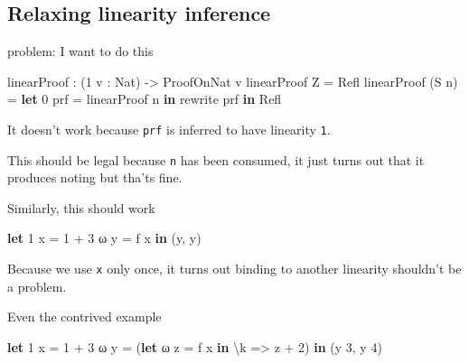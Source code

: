 \documentclass[
]{article}
\newenvironment{Shaded}{}{}
\newcommand{\DataTypeTok}[1]{\textcolor[rgb]{0.56,0.13,0.00}{#1}}
\newcommand{\DecValTok}[1]{\textcolor[rgb]{0.25,0.63,0.44}{#1}}
\newcommand{\KeywordTok}[1]{\textcolor[rgb]{0.00,0.44,0.13}{\textbf{#1}}}
\newcommand{\NormalTok}[1]{#1}
\newcommand{\OperatorTok}[1]{\textcolor[rgb]{0.40,0.40,0.40}{#1}}
\newcommand{\OtherTok}[1]{\textcolor[rgb]{0.00,0.44,0.13}{#1}}
\begin{document}
\hypertarget{relaxing-linearity-inference}{%
\subsection{Relaxing linearity
inference}\label{relaxing-linearity-inference}}

problem: I want to do this

\begin{Shaded}
\begin{Highlighting}[]
\NormalTok{linearProof }\OperatorTok{:}\NormalTok{ (}\DecValTok{1}\NormalTok{ v }\OperatorTok{:} \DataTypeTok{Nat}\NormalTok{) }\OtherTok{{-}\textgreater{}} \DataTypeTok{ProofOnNat}\NormalTok{ v}
\NormalTok{linearProof }\DataTypeTok{Z} \OtherTok{=} \DataTypeTok{Refl} 
\NormalTok{linearProof (}\DataTypeTok{S}\NormalTok{ n) }\OtherTok{=} \KeywordTok{let} \DecValTok{0}\NormalTok{ prf }\OtherTok{=}\NormalTok{ linearProof n }\KeywordTok{in} 
\NormalTok{                        rewrite prf }\KeywordTok{in} \DataTypeTok{Refl}
\end{Highlighting}
\end{Shaded}

It doesn't work because \texttt{prf} is inferred to have linearity
\texttt{1}.

This should be legal because \texttt{n} has been consumed, it just turns
out that it produces noting but tha'ts fine.

Similarly, this should work

\begin{Shaded}
\begin{Highlighting}[]
\KeywordTok{let} \DecValTok{1}\NormalTok{ x }\OtherTok{=} \DecValTok{1} \OperatorTok{+} \DecValTok{3}
\NormalTok{    ω y }\OtherTok{=}\NormalTok{ f x }\KeywordTok{in}
\NormalTok{    (y, y)}
\end{Highlighting}
\end{Shaded}

Because we use \texttt{x} only once, it turns out binding to another
linearity shouldn't be a problem.

Even the contrived example

\begin{Shaded}
\begin{Highlighting}[]
\KeywordTok{let} \DecValTok{1}\NormalTok{ x }\OtherTok{=} \DecValTok{1} \OperatorTok{+} \DecValTok{3}
\NormalTok{    ω y }\OtherTok{=}\NormalTok{ (}\KeywordTok{let}\NormalTok{ ω z }\OtherTok{=}\NormalTok{ f x }\KeywordTok{in}\NormalTok{ \textbackslash{}k }\OtherTok{=\textgreater{}}\NormalTok{ z }\OperatorTok{+} \DecValTok{2}\NormalTok{) }\KeywordTok{in}
\NormalTok{    (y }\DecValTok{3}\NormalTok{, y }\DecValTok{4}\NormalTok{)}
\end{Highlighting}
\end{Shaded}
\end{document}

